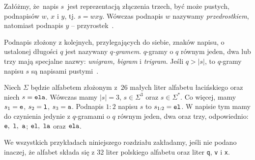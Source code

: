 \documentclass{praca1}
\begin{document}
\begin{definition}
Załóżmy, że~napis $s$~jest reprezentacją złączenia trzech, być może pustych, podnapisów $w$, $x$ i $y$, tj. $s = wxy$. Wówczas podnapis $w$ nazywamy \emph{przedrostkiem}, natomiast podnapis $y$ -- przyrostek~\cite{Boytsov2011:indexingmethods}.
\end{definition}

\begin{definition}
Podnapis złożony z kolejnych, przylegających do siebie, znaków napisu, o ustalonej długości $q$ jest nazywany \emph{$q$-gramem}. $q$-gramy o $q$ równym jeden, dwa lub trzy mają specjalne nazwy: \emph{unigram, bigram} i \emph{trigram}. Jeśli $q > |s|$, to $q$-gramy napisu $s$ są napisami pustymi~\cite{Boytsov2011:indexingmethods}.
\end{definition}



\begin{example}
Niech $\Sigma$ będzie alfabetem złożonym z~$26$ małych liter alfabetu łacińskiego oraz niech $s = \verb|ela|$. Wówczas mamy $|s| = 3$, $s \in \Sigma^3$ oraz $s \in \Sigma^*$. Co więcej, mamy $s_1 = \verb|e|$, $s_2 = \verb|l|$, $s_3 = \verb|a|$. Podnapis $1:2$ napisu $s$ to $s_{1:2} = \verb|el|$. W napisie tym mamy do czynienia jedynie z $q$-gramami o $q$ równym jeden, dwa oraz trzy, odpowiednio: $\verb|e|,\ \verb|l|,\ \verb|a|$; $\verb|el|,\ \verb|la|$ oraz $\verb|ela|$.
\end{example}


We wszystkich przykładach niniejszego rozdziału zakładamy, jeśli nie podano inaczej, że alfabet składa się z $32$ liter polskiego alfabetu oraz liter \verb|q|, \verb|v| i \verb|x|.
\end{document}
